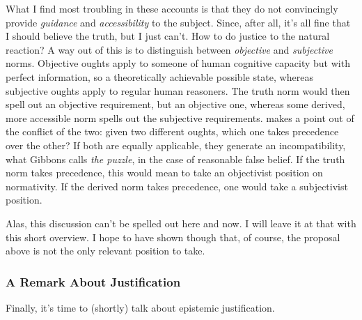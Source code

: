 \documentclass[12pt,numbers=noenddot]{scrartcl}
\begin{document}
What I find most troubling in these accounts is that they do not convincingly provide \emph{guidance} and \emph{accessibility} to the subject. Since, after all, it's all fine that I should believe the truth, but I just can't. How to do justice to the natural reaction? A way out of this is to distinguish between \emph{objective} and \emph{subjective} norms. Objective oughts apply to someone of human cognitive capacity but with perfect information, so a theoretically achievable possible state, whereas subjective oughts apply to regular human reasoners. The truth norm would then spell out an objective requirement, but an objective one, whereas some derived, more accessible norm spells out the subjective requirements. \textcite[Ch. 2]{Gibbons2013-GIBTNO} makes a point out of the conflict of the two: given two different oughts, which one takes precedence over the other? If both are equally applicable, they generate an incompatibility, what Gibbons calls \emph{the puzzle}, in the case of reasonable false belief. If the truth norm takes precedence, this would mean to take an objectivist position on normativity. If the derived norm takes precedence, one would take a subjectivist position.

Alas, this discussion can't be spelled out here and now. I will leave it at that with this short overview. I hope to have shown though that, of course, the proposal above is not the only relevant position to take.

\subsubsection{A Remark About Justification}

Finally, it's time to (shortly) talk about epistemic justification. 
\end{document}
